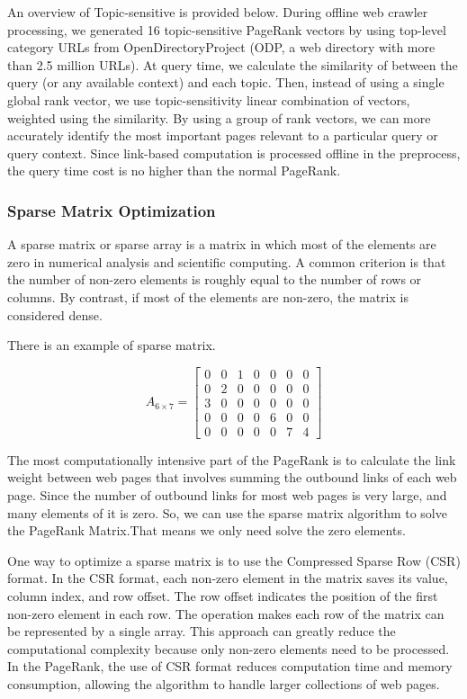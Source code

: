 \documentclass[lettersize,journal,12pt]{IEEEtran}
\begin{document}
An overview of Topic-sensitive is provided below. During offline web crawler processing, we generated 16 topic-sensitive PageRank vectors by using top-level category URLs from OpenDirectoryProject (ODP, a web directory with more than 2.5 million URLs). At query time, we calculate the similarity of between the query (or any available context) and each topic. Then, instead of using a single global rank vector, we use topic-sensitivity linear combination of vectors, weighted using the similarity. By using a group of rank vectors, we can more accurately identify the most important pages relevant to a particular query or query context. Since link-based computation is processed offline in the preprocess, the query time cost is no higher than the normal PageRank.
\subsubsection{Sparse Matrix Optimization}
A sparse matrix or sparse array is a matrix in which most of the elements are zero in numerical analysis and scientific computing. A common criterion is that the number of non-zero elements is roughly equal to the number of rows or columns. By contrast, if most of the elements are non-zero, the matrix is considered dense.

There is an example of sparse matrix.

\begin{equation}
	A_{6\times 7}=
	\begin{bmatrix}
		0&0&1&0&0&0&0\\
		0&2&0&0&0&0&0\\
		3&0&0&0&0&0&0\\
		0&0&0&0&6&0&0\\
		0&0&0&0&0&7&4
	\end{bmatrix}
\end{equation}

The most computationally intensive part of the PageRank is to calculate the link weight between web pages that involves summing the outbound links of each web page. Since the number of outbound links for most web pages is very large, and many elements of it is zero. So, we can use the sparse matrix algorithm to solve the PageRank Matrix.That means we only need solve the zero elements.

One way to optimize a sparse matrix is to use the Compressed Sparse Row (CSR) format. In the CSR format, each non-zero element in the matrix saves its value, column index, and row offset. The row offset indicates the position of the first non-zero element in each row. The operation makes each row of the matrix can be represented by a single array. This approach can greatly reduce the computational complexity because only non-zero elements need to be processed. In the PageRank, the use of CSR format reduces computation time and memory consumption, allowing the algorithm to handle larger collections of web pages.
\end{document}
